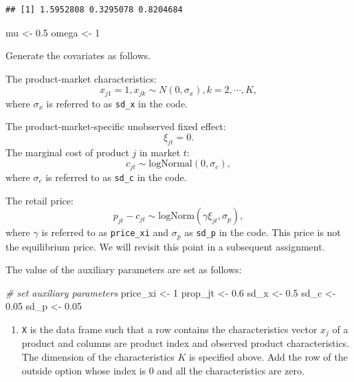 \documentclass[
]{book}
\newenvironment{Shaded}{\begin{snugshade}}{\end{snugshade}}
\newcommand{\CommentTok}[1]{\textcolor[rgb]{0.56,0.35,0.01}{\textit{#1}}}
\newcommand{\DecValTok}[1]{\textcolor[rgb]{0.00,0.00,0.81}{#1}}
\newcommand{\FloatTok}[1]{\textcolor[rgb]{0.00,0.00,0.81}{#1}}
\newcommand{\NormalTok}[1]{#1}
\newcommand{\OtherTok}[1]{\textcolor[rgb]{0.56,0.35,0.01}{#1}}
\providecommand{\tightlist}{%
  \setlength{\itemsep}{0pt}\setlength{\parskip}{0pt}}
\begin{document}
\begin{verbatim}
## [1] 1.5952808 0.3295078 0.8204684
\end{verbatim}

\begin{Shaded}
\begin{Highlighting}[]
\NormalTok{mu }\OtherTok{\textless{}{-}} \FloatTok{0.5}
\NormalTok{omega }\OtherTok{\textless{}{-}} \DecValTok{1}
\end{Highlighting}
\end{Shaded}

Generate the covariates as follows.

The product-market characteristics:
\[
x_{j1} = 1, x_{jk} \sim N(0, \sigma_x), k = 2, \cdots, K,
\]
where \(\sigma_x\) is referred to as \texttt{sd\_x} in the code.

The product-market-specific unobserved fixed effect:
\[
\xi_{jt} = 0.
\]
The marginal cost of product \(j\) in market \(t\):
\[
c_{jt} \sim \text{logNormal}(0, \sigma_c),
\]
where \(\sigma_c\) is referred to as \texttt{sd\_c} in the code.

The retail price:
\[
p_{jt} - c_{jt} \sim \text{logNorm}(\gamma \xi_{jt}, \sigma_p),
\]
where \(\gamma\) is referred to as \texttt{price\_xi} and \(\sigma_p\) as \texttt{sd\_p} in the code. This price is not the equilibrium price. We will revisit this point in a subsequent assignment.

The value of the auxiliary parameters are set as follows:

\begin{Shaded}
\begin{Highlighting}[]
\CommentTok{\# set auxiliary parameters}
\NormalTok{price\_xi }\OtherTok{\textless{}{-}} \DecValTok{1}
\NormalTok{prop\_jt }\OtherTok{\textless{}{-}} \FloatTok{0.6}
\NormalTok{sd\_x }\OtherTok{\textless{}{-}} \FloatTok{0.5}
\NormalTok{sd\_c }\OtherTok{\textless{}{-}} \FloatTok{0.05}
\NormalTok{sd\_p }\OtherTok{\textless{}{-}} \FloatTok{0.05}
\end{Highlighting}
\end{Shaded}

\begin{enumerate}
\def\labelenumi{\arabic{enumi}.}
\setcounter{enumi}{1}
\tightlist
\item
  \texttt{X} is the data frame such that a row contains the characteristics vector \(x_{j}\) of a product and columns are product index and observed product characteristics. The dimension of the characteristics \(K\) is specified above. Add the row of the outside option whose index is \(0\) and all the characteristics are zero.
\end{enumerate}
\end{document}
